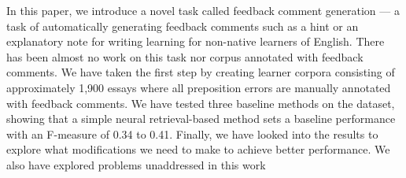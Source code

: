 In this paper, we introduce a novel task called feedback comment generation --- a task of automatically generating feedback comments such as a hint or an explanatory note for writing learning for non-native learners of English. There has been almost no work on this task nor corpus annotated with feedback comments. We have taken the first step by creating learner corpora consisting of approximately 1,900 essays where all preposition errors are manually annotated with feedback comments. We have tested three baseline methods on the dataset, showing that a simple neural retrieval-based method sets a baseline performance with an F-measure of 0.34 to 0.41. Finally, we have looked into the results to explore what modifications we need to make to achieve better performance. We also have explored problems unaddressed in this work